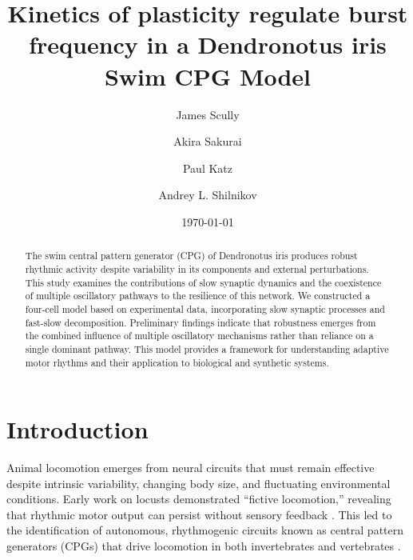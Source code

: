 \documentclass[nofootinbib,aip,amsmath,amssymb,reprint,twocolumn,10pt]{revtex4-2}
\begin{document}
\title{Kinetics of plasticity regulate burst frequency in a Dendronotus iris Swim CPG Model}

\author{James Scully}
\author{Akira Sakurai}
\author{Paul Katz}
\author{Andrey L. Shilnikov}


\date{\today}
\begin{abstract}

The swim central pattern generator (CPG) of Dendronotus iris produces robust rhythmic activity despite variability in its components and external perturbations.
This study examines the contributions of slow synaptic dynamics and the coexistence of multiple oscillatory pathways to the resilience of this network.
We constructed a four-cell model based on experimental data, incorporating slow synaptic processes and fast-slow decomposition.
Preliminary findings indicate that robustness emerges from the combined influence of multiple oscillatory mechanisms rather than reliance on a single dominant pathway.
This model provides a framework for understanding adaptive motor rhythms and their application to biological and synthetic systems.
\end{abstract}

\maketitle
\section{Introduction}
Animal locomotion emerges from neural circuits that must remain effective despite intrinsic variability, changing body size, and fluctuating environmental conditions.
Early work on locusts demonstrated ``fictive locomotion,'' revealing that rhythmic motor output can persist without sensory feedback \cite{Wilson1961}.
This led to the identification of autonomous, rhythmogenic circuits known as central pattern generators (CPGs) that drive locomotion in both invertebrates and vertebrates \cite{MarderCalabrese1996, Kiehn2006}.
\end{document}
